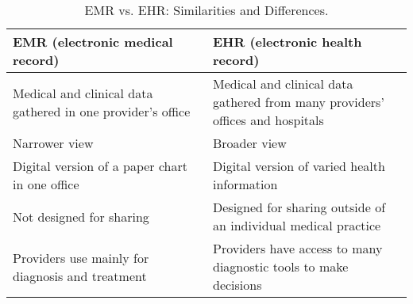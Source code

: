 \begin{table}[h!]
    \centering
    \begin{tabular}{|m{0.50\linewidth}|m{0.50\linewidth}|}
        \hline
        \textbf{EMR (electronic medical record)}                             & \textbf{EHR (electronic health record)}                                  \\
        
        \hline
        Medical and clinical data gathered in one provider's office         & Medical and clinical data gathered from many providers' offices and hospitals     \\
        
        \hline
        Narrower view                       & Broader view        \\
        
        \hline
        Digital version of a paper chart in one office                       & Digital version of varied health information        \\
        
        \hline
        Not designed for sharing                             & Designed for sharing outside of an individual medical practice       \\
        
        \hline
        Providers use mainly for diagnosis and treatment     & Providers have access to many diagnostic tools to make decisions       \\
        
        \hline
    \end{tabular} 

    \caption{EMR vs. EHR: Similarities and Differences.}
    \label{tab:EMRvsEHR}
\end{table}